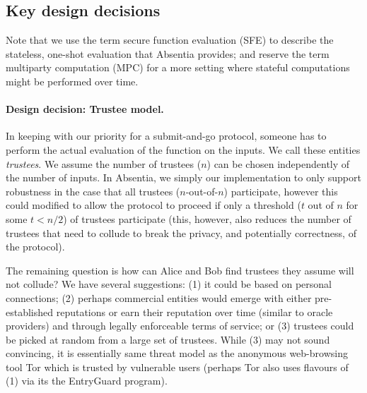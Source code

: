  
\subsection{Key design decisions}

Note that we use the term secure function evaluation (SFE) to describe the stateless, one-shot evaluation that Absentia provides; and reserve the term multiparty computation (MPC) for a more setting where stateful computations might be performed over time.

\paragraph{Design decision: Trustee model.} In keeping with our priority for a submit-and-go protocol, someone has to perform the actual evaluation of the function on the inputs. We call these entities \emph{trustees}. We assume the number of trustees ($n$) can be chosen independently of the number of inputs. In Absentia, we simply our implementation to only support robustness in the case that all trustees ($n$-out-of-$n$) participate, however this could modified to allow the protocol to proceed if only a threshold ($t$ out of $n$ for some $t<n/2$) of trustees participate (this, however, also reduces the number of trustees that need to collude to break the privacy, and potentially correctness, of the protocol).  

The remaining question is how can Alice and Bob find trustees they assume will not collude? We have several suggestions: (1) it could be based on personal connections; (2) perhaps commercial entities would emerge with either pre-established reputations or earn their reputation over time (similar to oracle providers) and through legally enforceable terms of service; or (3) trustees could be picked at random from a large set of trustees. While (3) may not sound convincing, it is essentially same threat model as the anonymous web-browsing tool Tor which is trusted by vulnerable users (perhaps Tor also uses flavours of (1) via its the EntryGuard program). 

